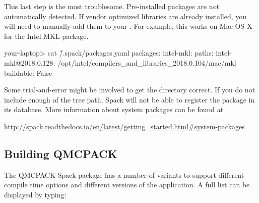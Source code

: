 This last step is the most troublesome. Pre-installed packages are not
automatically detected. If vendor optimized libraries are already
installed, you will need to manually add them to your
. For example, this works on Mac OS X
for the Intel MKL package.

\begin{shade}
your-laptop> cat \~/.spack/packages.yaml
packages:
    intel-mkl:
        paths:
            intel-mkl@2018.0.128: /opt/intel/compilers_and_libraries_2018.0.104/mac/mkl
        buildable: False
\end{shade}

Some trial-and-error might be involved to get the directory correct. If
you do not include enough of the tree path, Spack will not be able to
register the package in its database. More information about system
packages can be found at

\url{http://spack.readthedocs.io/en/latest/getting_started.html#system-packages}

\subsection{Building QMCPACK}
The QMCPACK Spack package has a number of variants to support different compile time
options and different versions of the application. A full list can be displayed by typing:

